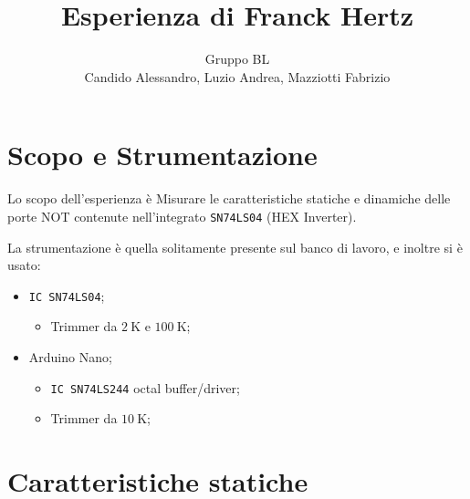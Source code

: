 \documentclass[a4paper,10pt]{article}
\title{Esperienza di Franck Hertz}
\author{Gruppo BL \\ Candido Alessandro, Luzio Andrea, Mazziotti Fabrizio}
\def\code#1{\texttt{#1}}
\begin{document}
\maketitle


\section{Scopo e Strumentazione}
Lo scopo dell'esperienza è Misurare le caratteristiche statiche e dinamiche delle porte NOT contenute nell’integrato \code{SN74LS04} (HEX Inverter).

La strumentazione è quella solitamente presente sul banco di lavoro, e inoltre si è usato:
\begin{itemize}
	\item \code{IC SN74LS04};
	\begin{itemize}
		\item Trimmer da $2~$K e $100~$K;
	\end{itemize}
	\item Arduino Nano; 
	\begin{itemize}
		\item \code{IC SN74LS244} octal buffer/driver; 
		\item Trimmer da $10~$K;
	\end{itemize}
\end{itemize}

%
%
%

\section{Caratteristiche statiche}
\end{document}
